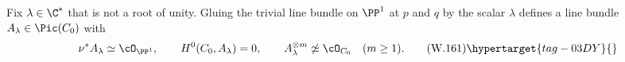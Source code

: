 
\begin{lemma}
\hypertarget{tag-03IB}{}\label{wbII:lem:gluing-bundle}


Fix $\lambda\in\C^*$ that is not a root of unity.  Gluing the trivial line
bundle on $\PP^1$ at $p$ and $q$ by the scalar $\lambda$ defines a line bundle
\(A_\lambda\in\Pic(C_0)\) with
\[
 \nu^*A_\lambda\simeq\cO_{\PP^1},\qquad
 H^0(C_0,A_\lambda)=0,\qquad
 A_\lambda^{\otimes m}\not\simeq\cO_{C_0}\quad(m\ge1).
 \tag{W.161}\hypertarget{tag-03DY}{}\label{wbII:eq:CN:4.4}
\]
\end{lemma}

